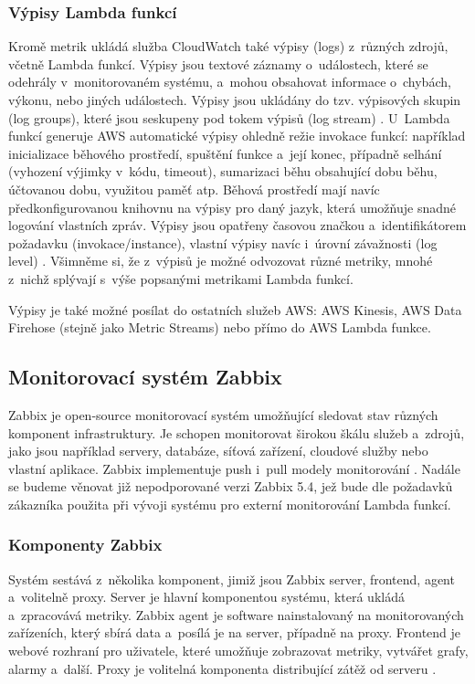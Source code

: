 \documentclass[czech, ing, kiv, he, iso690]{fasthesis}
\begin{document}
\subsubsection{Výpisy Lambda funkcí}
Kromě metrik ukládá služba CloudWatch také výpisy (logs) z~různých zdrojů, včetně Lambda funkcí. Výpisy jsou textové záznamy o~událostech, které se odehrály v~monitorovaném systému, a~mohou obsahovat informace o~chybách, výkonu, nebo jiných událostech. Výpisy jsou ukládány do tzv. výpisových skupin (log groups), které jsou seskupeny pod tokem výpisů (log stream) \cite{cloudwatch.docs.aws}. U~Lambda funkcí generuje AWS automatické výpisy ohledně režie invokace funkcí: například inicializace běhového prostředí, spuštění funkce a~její konec, případně selhání (vyhození výjimky v~kódu, timeout), sumarizaci běhu obsahující dobu běhu, účtovanou dobu, využitou paměť atp. Běhová prostředí mají navíc předkonfigurovanou knihovnu na výpisy pro daný jazyk, která umožňuje snadné logování vlastních zpráv. Výpisy jsou opatřeny časovou značkou a~identifikátorem požadavku (invokace/instance), vlastní výpisy navíc i~úrovní závažnosti (log level) \cite{lambda.docs.aws}. Všimněme si, že z~výpisů je možné odvozovat různé metriky, mnohé z~nichž splývají s~výše popsanými metrikami Lambda funkcí.

Výpisy je také možné posílat do ostatních služeb AWS: AWS Kinesis, AWS Data Firehose (stejně jako Metric Streams) nebo přímo do AWS Lambda funkce. 

\subsection{Monitorovací systém Zabbix}
Zabbix je open-source monitorovací systém umožňující sledovat stav různých komponent infrastruktury. Je schopen monitorovat širokou škálu služeb a~zdrojů, jako jsou například servery, databáze, síťová zařízení, cloudové služby nebo vlastní aplikace. Zabbix implementuje push i~pull modely monitorování \cite{docs.zabbix}. Nadále se budeme věnovat již nepodporované verzi Zabbix 5.4, jež bude dle požadavků zákazníka použita při vývoji systému pro externí monitorování Lambda funkcí.

\subsubsection{Komponenty Zabbix}
Systém sestává z~několika komponent, jimiž jsou Zabbix server, frontend, agent a~volitelně proxy. Server je hlavní komponentou systému, která ukládá a~zpracovává metriky. Zabbix agent je software nainstalovaný na monitorovaných zařízeních, který sbírá data a~posílá je na server, případně na proxy. Frontend je webové rozhraní pro uživatele, které umožňuje zobrazovat metriky, vytvářet grafy, alarmy a~další. Proxy je volitelná komponenta distribující zátěž od serveru \cite{docs.zabbix}.
\end{document}
